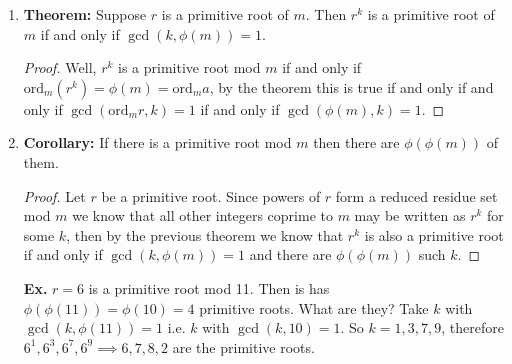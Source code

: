 \documentclass[class=article, crop=false]{standalone}
\begin{document}
\begin{enumerate}
\begin{enumerate}
\begin{proof}
\begin{itemize}
			\item Second observe:
			\begin{align*}
				a^{k \mbox{ord}_m \left(a^k\right)} &= \left(a^k\right)^{\mbox{ord}_m \left(a^k\right)} \\
				&\equiv 1\mbox{ mod }m
			\end{align*}
			So then, 
			$\mbox{ord}_m a \Big| k\mbox{ord}_m \left(a^k\right)\implies
			\frac{\mbox{ord}_m a}{\gcd(\mbox{ord}_m a, k)} \Big|
			\frac{k\cdot \mbox{ord}_m \left(a^k \right) }{\gcd(\mbox{ord}_m a, k)}$.
			Then, because $\gcd$ of two fractions is $1$ we get,
			$\frac{\mbox{ord}_m a}{\gcd(\mbox{ord}_m a, k)} \Big| \mbox{ord}_m \left(a^k\right)$,
			and so $\frac{\mbox{ord}_m a}{\gcd(\mbox{ord}_m a, k)} \leq \mbox{ord}_m \left(a^k\right)$
 		\end{itemize}
		Thus, the two results together give us that 
		$$\mbox{ord}_m \left(a^k\right) = \frac{\mbox{ord}_m a}{\gcd(\mbox{ord}_m a, k)}$$
	\end{proof}

	\item \textbf{Theorem:} Suppose $r$ is a primitive root of $m$. Then $r^k$ is a primitive root of $m$
	if and only if $\gcd(k,\phi(m))=1$.
	\begin{proof}
		Well, $r^k$ is a primitive root mod $m$ if and only if $\mbox{ord}_m \left(r^k\right) = \phi(m)=\mbox{ord}_m a$,
		by the theorem this is true if and only if and only if
		$\gcd(\mbox{ord}_m r, k)=1$ if and only if $\gcd(\phi(m), k)=1$.
	\end{proof}

	\item \textbf{Corollary:} If there is a primitive root mod $m$ then there are $\phi(\phi(m))$ of them.
	\begin{proof}
		Let $r$ be a primitive root. Since powers of $r$ form a reduced residue set mod $m$ we know that all
		other integers coprime to $m$ may be written as $r^k$ for some $k$, then by the previous theorem
		we know that $r^k$ is also a primitive root if and only if $\gcd(k,\phi(m))=1$ and there are 
		$\phi(\phi(m))$ such $k$.
	\end{proof}
	\noindent\textbf{Ex.} $r=6$ is a primitive root mod 11. Then is has $\phi(\phi(11))=\phi(10)=4$
	primitive roots. What are they? Take $k$ with $\gcd(k, \phi(11))=1$ i.e. $k$ with $\gcd(k,10)=1$.
	So $k=1,3,7,9$, therefore $6^1, 6^3, 6^7, 6^9 \implies 6,7,8,2$ are the primitive roots.
\end{enumerate}
\end{enumerate}
\end{document}

